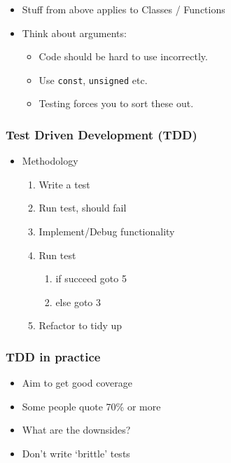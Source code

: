 \begin{itemize}
\itemsep1pt\parskip0pt
\item
  Stuff from above applies to Classes / Functions
\item
  Think about arguments:

  \begin{itemize}
  \itemsep1pt\parskip0pt
  \item
    Code should be hard to use incorrectly.
  \item
    Use \texttt{const}, \texttt{unsigned} etc.
  \item
    Testing forces you to sort these out.
  \end{itemize}
\end{itemize}

\subsubsection{Test Driven Development
(TDD)}\label{test-driven-development-tdd}

\begin{itemize}
\itemsep1pt\parskip0pt
\item
  Methodology

  \begin{enumerate}
  \def\labelenumi{\arabic{enumi}.}
  \itemsep1pt\parskip0pt
  \item
    Write a test
  \item
    Run test, should fail
  \item
    Implement/Debug functionality
  \item
    Run test

    \begin{enumerate}
    \def\labelenumii{\arabic{enumii}.}
    \itemsep1pt\parskip0pt
    \item
      if succeed goto 5
    \item
      else goto 3
    \end{enumerate}
  \item
    Refactor to tidy up
  \end{enumerate}
\end{itemize}

\subsubsection{TDD in practice}\label{tdd-in-practice}

\begin{itemize}
\itemsep1pt\parskip0pt
\item
  Aim to get good coverage
\item
  Some people quote 70\% or more
\item
  What are the downsides?
\item
  Don't write `brittle' tests
\end{itemize}

